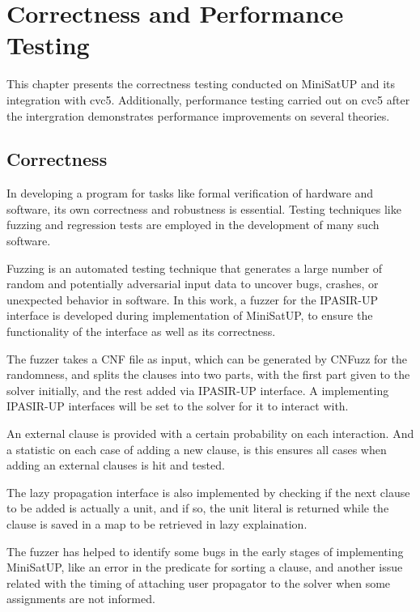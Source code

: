 \chapter{Correctness and Performance Testing}

This chapter presents the correctness testing conducted on MiniSatUP and its integration with cvc5. Additionally, performance testing carried out on cvc5 after the intergration demonstrates performance improvements on several theories.

\section{Correctness}

In developing a program for tasks like formal verification of hardware and software, its own correctness and robustness is essential. Testing techniques like fuzzing and regression tests are employed in the development of many such software.

Fuzzing is an automated testing technique that generates a large number of random and potentially adversarial input data to uncover bugs, crashes, or unexpected behavior in software. In this work, a fuzzer for the IPASIR-UP interface is developed during implementation of MiniSatUP, to ensure the functionality of the interface as well as its correctness.

The fuzzer takes a CNF file as input, which can be generated by CNFuzz for the randomness, and splits the clauses into two parts, with the first part given to the solver initially, and the rest added via IPASIR-UP interface. A  implementing IPASIR-UP interfaces will be set to the solver for it to interact with.

An external clause is provided with a certain probability on each interaction. And a statistic on each case of adding a new clause, is  this ensures all cases when adding an external clauses is hit and tested.

The lazy propagation interface is also implemented by checking if the next clause to be added is actually a unit, and if so, the unit literal is returned while the clause is saved in a map to be retrieved in lazy explaination.

The fuzzer has helped to identify some bugs in the early stages of implementing MiniSatUP, like an error in the predicate for sorting a clause, and another issue related with the timing of attaching user propagator to the solver when some assignments are not informed.

